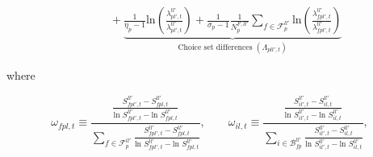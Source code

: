 \begin{linenomath*}
\begin{equation}
\begin{aligned}
                & \qquad +
                \underbrace{
                    \frac{1}{\eta_p-1}
                    \text{ln}
                    \left(
                        \frac{\lambda^{ll'}_{pl',t}}{\lambda^{ll'}_{pl',t}}
                    \right)
                    + 
                    \frac{1}{\sigma_p-1}
                    \frac{1}{N^{F,ll'}_{p}}
                    \sum_{f \in \mathcal{F}^{ll'}_{p}} 
                        \text{ln}
                        \left(
                            \frac{\lambda^{ll'}_{fpl',t}}{\lambda^{ll'}_{fpl',t}}
                        \right)}_{\text{Choice set differences } (\Lambda_{pll',t})}
    \end{aligned}
    \end{equation}
\end{linenomath*}
where 
\begin{linenomath*}
    \begin{equation*}
        \omega_{fpl,t} 
            \equiv  \frac{
                        \frac{S^{ll'}_{fpl',t} - S^{ll'}_{fpl,t}}
                             {\text{ln }S^{ll'}_{fpl',t} - \text{ln }S^{ll'}_{fpl,t}}}
                         {\sum_{f \in \mathcal{F}^{ll'}_{p}} 
                            \frac{S^{ll'}_{fpl',t} - S^{ll'}_{fpl,t}}
                            {\text{ln }S^{ll'}_{fpl',t} - \text{ln }S^{ll'}_{fpl,t}}}, 
        \qquad 
        \omega_{il,t} 
            \equiv  \frac{
                        \frac{S^{ll'}_{il',t} - S^{ll'}_{il,t}}
                             {\text{ln }S^{ll'}_{il',t} - \text{ln }S^{ll'}_{il,t}}}
                         {\sum_{i \in \mathcal{B}^{ll'}_{fp}} 
                            \frac{S^{ll'}_{il',t} - S^{ll'}_{il,t}}
                            {\text{ln }S^{ll'}_{il',t} - \text{ln }S^{ll'}_{il,t}}}, 
    \end{equation*}
\end{linenomath*}
